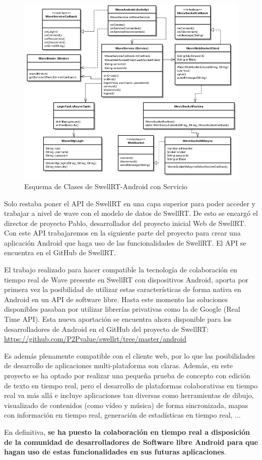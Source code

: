   \begin{figure}[!]
   \centering
	\includegraphics[keepaspectratio, scale=0.5]{Media/Diagrams/waveServiceClassDiagram.png}
    \caption{Esquema de Clases de SwellRT-Android con Servicio}
   \label{fig:sequenceDiagram_waveWebSocket}
  \end{figure}
    
    Solo restaba poner el API de SwellRT en una capa superior para poder acceder y trabajar a nivel de wave con el modelo de datos de SwellRT. De esto se encargó el director de proyecto Pablo, desarrollador del proyecto inicial Web de SwellRT. Con este API trabajaremos en la siguiente parte del proyecto para crear una aplicación Android que haga uso de las funcionalidades de SwellRT. El API se encuentra en el GitHub de SwellRT.
    
    El trabajo realizado para hacer compatible la tecnología de colaboración en tiempo real de Wave presente en SwellRT con dispositivos Android, aporta por primera vez la posibilidad de utilizar estas características de forma nativa en Android en un API de software libre. Hasta este momento las soluciones disponibles pasaban por utilizar librerías privativas como la de Google (Real Time API). Esta nueva aportación se encuentra ahora disponible para los desarrolladores de Android en el GitHub del proyecto de SwellRT: \url{https://github.com/P2Pvalue/swellrt/tree/master/android}

Es además plenamente compatible con el cliente web, por lo que las posibilidades de desarrollo de aplicaciones multi-plataforma son claras. Además, en este proyecto se ha optado por realizar una pequeña prueba de concepto con edición de texto en tiempo real, pero el desarrollo de plataformas colaborativas en tiempo real va más allá e incluye aplicaciones tan diversas como herramientas de dibujo, visualizado de contenidos (como vídeo y música) de forma sincronizada, mapas con información en tiempo real, generación de estadísticas en tiempo real, ...

En definitiva, \textbf{se ha puesto la colaboración en tiempo real a disposición de la comunidad de desarrolladores de Software libre Android para que hagan uso de estas funcionalidades en sus futuras aplicaciones}.